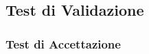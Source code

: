 	
		
	
	
	\subsection{Test di Validazione}
		\subsubsection{Test di Accettazione}	
				
				
				\pagebreak
				